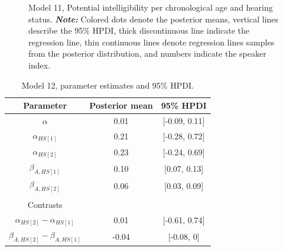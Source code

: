 \documentclass[
  authoryear,
  preprint,
  1p]{elsarticle}
\begin{document}
\label{cell-fig-rq3-intelligibility-model11}
\begin{figure}[H]


\caption{\label{fig-rq3-intelligibility-model11}Model 11, Potential
intelligibility per chronological age and hearing status.
\textbf{\emph{Note:}} Colored dots denote the posterior means, vertical
lines describe the 95\% HPDI, thick discontinuous line indicate the
regression line, thin continuous lines denote regression lines samples
from the posterior distribution, and numbers indicate the speaker
index.}

\end{figure}%

\begin{longtable}[]{@{}ccc@{}}

\caption{\label{tbl-parameter-model12}Model 12, parameter estimates and
95\% HPDI.}

\tabularnewline

\toprule\noalign{}
Parameter & Posterior mean & 95\% HPDI \\
\midrule\noalign{}
\endhead
\bottomrule\noalign{}
\endlastfoot
\(\alpha\) & 0.01 & {[}-0.09, 0.11{]} \\
\(\alpha_{HS[1]}\) & 0.21 & {[}-0.28, 0.72{]} \\
\(\alpha_{HS[2]}\) & 0.23 & {[}-0.24, 0.69{]} \\
\(\beta_{A,HS[1]}\) & 0.10 & {[}0.07, 0.13{]} \\
\(\beta_{A,HS[2]}\) & 0.06 & {[}0.03, 0.09{]} \\
& & \\
Contrasts & & \\
\(\alpha_{HS[2]} - \alpha_{HS[1]}\) & 0.01 & {[}-0.61, 0.74{]} \\
\(\beta_{A,HS[2]} - \beta_{A,HS[1]}\) & -0.04 & {[}-0.08, 0{]} \\

\end{longtable}
\end{document}
